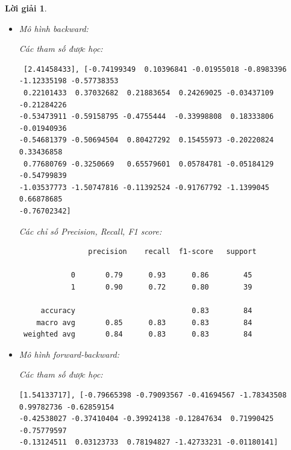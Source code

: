 \documentclass[14pt, a4paper]{article}
\theoremstyle{sltheorem}
\theoremstyle{soltheorem}
\newtheorem*{loigiai}{Lời giải}
\begin{document}
\begin{loigiai}
\begin{itemize}
        Các chỉ số Precision, Recall, F1 score:

        \begin{verbatim}
                precision    recall  f1-score   support

            0       0.95      0.84      0.89        45
            1       0.84      0.95      0.89        39
 
     accuracy                           0.89        84
    macro avg       0.90      0.90      0.89        84
 weighted avg       0.90      0.89      0.89        84
        \end{verbatim}

        \item Mô hình backward:
        
        Các tham số được học:

        \begin{verbatim}
 [2.41458433], [-0.74199349  0.10396841 -0.01955018 -0.8983396  -1.12335198 -0.57738353
 0.22101433  0.37032682  0.21883654  0.24269025 -0.03437109 -0.21284226
-0.53473911 -0.59158795 -0.4755444  -0.33998808  0.18333806 -0.01940936
-0.54681379 -0.50694504  0.80427292  0.15455973 -0.20220824  0.33436858
 0.77680769 -0.3250669   0.65579601  0.05784781 -0.05184129 -0.54799839
-1.03537773 -1.50747816 -0.11392524 -0.91767792 -1.1399045   0.66878685
-0.76702342]
        \end{verbatim}

        Các chỉ số Precision, Recall, F1 score:

        \begin{verbatim}
                precision    recall  f1-score   support

            0       0.79      0.93      0.86        45
            1       0.90      0.72      0.80        39
 
     accuracy                           0.83        84
    macro avg       0.85      0.83      0.83        84
 weighted avg       0.84      0.83      0.83        84
        \end{verbatim}

        \item Mô hình forward-backward:
        
        Các tham số được học:

        \begin{verbatim}
[1.54133717], [-0.79665398 -0.79093567 -0.41694567 -1.78343508  0.99782736 -0.62859154
-0.42538027 -0.37410404 -0.39924138 -0.12847634  0.71990425 -0.75779597
-0.13124511  0.03123733  0.78194827 -1.42733231 -0.01180141]
        \end{verbatim}


\end{itemize}
\end{loigiai}
\end{document}
